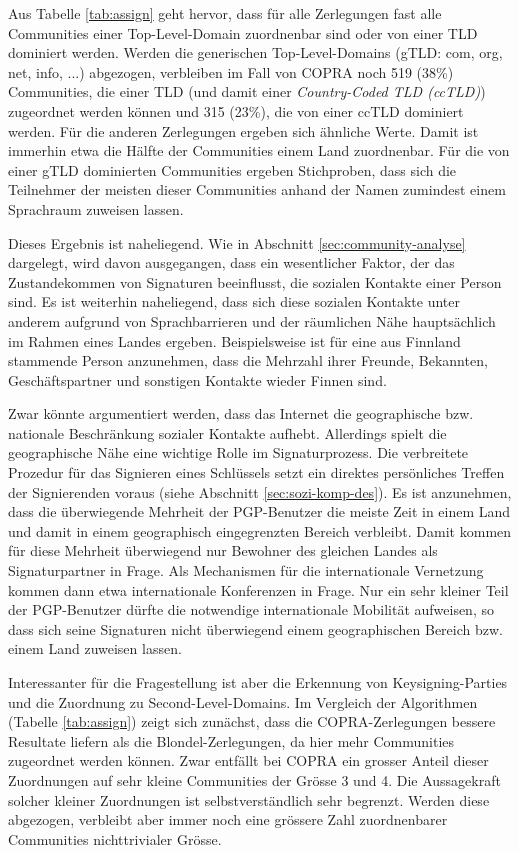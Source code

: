 Aus Tabelle \ref{tab:assign} geht hervor, dass f\"ur alle Zerlegungen
fast alle Communities einer Top-Level-Domain zuordnenbar sind oder von
einer TLD dominiert werden. Werden die generischen Top-Level-Domains
(gTLD: com, org, net, info, ...) abgezogen, verbleiben im Fall von COPRA
noch 519 (38\%) Communities, die einer TLD (und damit einer
\emph{Country-Coded TLD (ccTLD)}) zugeordnet werden k\"onnen und 315
(23\%), die von einer ccTLD dominiert werden. F\"ur die anderen
Zerlegungen ergeben sich \"ahnliche Werte. Damit ist immerhin etwa die
H\"alfte der Communities einem Land zuordnenbar. F\"ur die von einer
gTLD dominierten Communities ergeben Stichproben, dass sich die
Teilnehmer der meisten dieser Communities anhand der Namen zumindest
einem Sprachraum zuweisen lassen.

Dieses Ergebnis ist naheliegend. Wie in Abschnitt
\ref{sec:community-analyse} dargelegt, wird davon ausgegangen, dass
ein wesentlicher Faktor, der das Zustandekommen von Signaturen
beeinflusst, die sozialen Kontakte einer Person sind. Es ist weiterhin
naheliegend, dass sich diese sozialen Kontakte unter anderem aufgrund
von Sprachbarrieren und der r\"aumlichen N\"ahe haupts\"achlich im
Rahmen eines Landes ergeben. Beispielsweise ist f\"ur eine aus
Finnland stammende Person anzunehmen, dass die Mehrzahl ihrer Freunde,
Bekannten, Gesch\"aftspartner und sonstigen Kontakte wieder Finnen
sind.

Zwar k\"onnte argumentiert werden, dass das Internet die geographische
bzw. nationale Beschr\"ankung sozialer Kontakte aufhebt. Allerdings
spielt die geographische N\"ahe eine wichtige Rolle im
Signaturprozess. Die verbreitete Prozedur f\"ur das Signieren eines
Schl\"ussels setzt ein direktes pers\"onliches Treffen der
Signierenden voraus (siehe Abschnitt \ref{sec:sozi-komp-des}). Es ist
anzunehmen, dass die \"uberwiegende Mehrheit der PGP-Benutzer die
meiste Zeit in einem Land und damit in einem geographisch
eingegrenzten Bereich verbleibt. Damit kommen f\"ur diese Mehrheit
\"uberwiegend nur Bewohner des gleichen Landes als Signaturpartner in
Frage. Als Mechanismen f\"ur die internationale Vernetzung kommen dann
etwa internationale Konferenzen in Frage. Nur ein sehr kleiner Teil
der PGP-Benutzer d\"urfte die notwendige internationale Mobilit\"at
aufweisen, so dass sich seine Signaturen nicht \"uberwiegend einem
geographischen Bereich bzw. einem Land zuweisen lassen.

Interessanter f\"ur die Fragestellung ist aber die Erkennung von
Keysigning-Parties und die Zuordnung zu Second-Level-Domains. Im
Vergleich der Algorithmen (Tabelle \ref{tab:assign}) zeigt sich
zun\"achst, dass die COPRA-Zerlegungen bessere Resultate liefern als
die Blondel-Zerlegungen, da hier mehr Communities zugeordnet werden
k\"onnen. Zwar entf\"allt bei COPRA ein grosser Anteil dieser
Zuordnungen auf sehr kleine Communities der Gr\"osse 3 und 4. Die
Aussagekraft solcher kleiner Zuordnungen ist selbstverst\"andlich sehr
begrenzt. Werden diese abgezogen, verbleibt aber immer noch eine
gr\"ossere Zahl zuordnenbarer Communities nichttrivialer Gr\"osse. 

